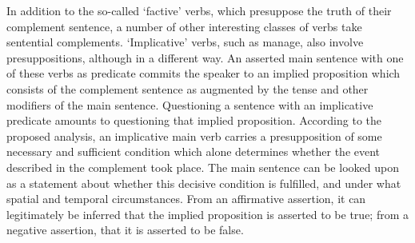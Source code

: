 In addition to the so-called `factive' verbs, which presuppose the truth of their complement sentence, a number of other interesting classes of verbs take sentential complements. `Implicative' verbs, such as manage, also involve presuppositions, although in a different way. An asserted main sentence with one of these verbs as predicate commits the speaker to an implied proposition which consists of the complement sentence as augmented by the tense and other modifiers of the main sentence. Questioning a sentence with an implicative predicate amounts to questioning that implied proposition. According to the proposed analysis, an implicative main verb carries a presupposition of some necessary and sufficient condition which alone determines whether the event described in the complement took place. The main sentence can be looked upon as a statement about whether this decisive condition is fulfilled, and under what spatial and temporal circumstances. From an affirmative assertion, it can legitimately be inferred that the implied proposition is asserted to be true; from a negative assertion, that it is asserted to be false.
\endinput